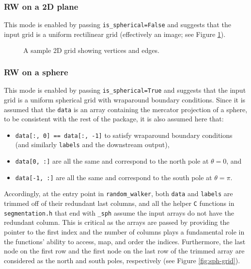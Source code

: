 \documentclass[12pt,letterpaper]{article}
\begin{document}
\subsubsection{RW on a 2D plane}
This mode is enabled by passing \texttt{is\_spherical=False} and suggests that 
the input grid is a uniform rectilinear grid (effectively an image; see Figure \ref{fig:2d-grid}). 
\begin{figure}[h]
    \centering
    \caption{A sample 2D grid showing vertices and edges.}
    \label{fig:2d-grid}
\end{figure}

\subsubsection{RW on a sphere}
This mode is enabled by passing \texttt{is\_spherical=True} and suggests that 
the input grid is a uniform spherical grid with wraparound boundary conditions.
Since it is assumed that the \texttt{data} is an array containing the mercator 
projection of a sphere, to be consistent with the rest of the package, it is also 
assumed here that:
\begin{itemize}
    \item \texttt{data[:, 0] == data[:, -1]} to satisfy wraparound boundary conditions (and similarly \texttt{labels} and the downstream output),
    \item \texttt{data[0, :]} are all the same and correspond to the north pole at $\theta = 0$, and
    \item \texttt{data[-1, :]} are all the same and correspond to the south pole at $\theta = \pi$.
\end{itemize}
Accordingly, at the entry point in \texttt{random\_walker}, both \texttt{data} and 
\texttt{labels} are trimmed off of their redundant last columns, and all the 
helper \texttt{C} functions in \texttt{segmentation.h} that end with \texttt{\_sph}
assume the input arrays do not have the redundant column. This is critical as 
the arrays are passed by providing the pointer to the first index and the number of 
columns plays a fundamental role in the functions' ability to access, map, and order 
the indices. Furthermore, the last node on the first row and 
the first node on the last row of the trimmed array are considered as the north 
and south poles, respectively (see Figure \ref{fig:sph-grid}).
\end{document}
